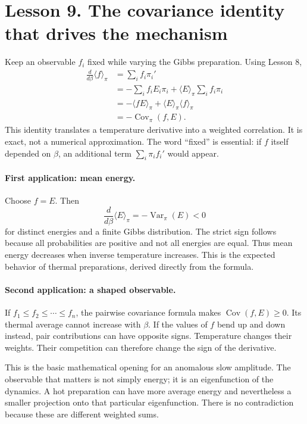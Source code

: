 \documentclass[11pt]{article}
\newcommand{\Cov}{\operatorname{Cov}}
\newcommand{\Var}{\operatorname{Var}}
\begin{document}
\clearpage
\section*{Lesson 9. The covariance identity that drives the mechanism}
Keep an observable $f_i$ fixed while varying the Gibbs preparation. Using
Lesson 8,
\begin{align*}
\frac{d}{d\beta}\langle f\rangle_\pi
&=\sum_i f_i\pi_i'\\
&=-\sum_i f_i E_i\pi_i+\langle E\rangle_\pi\sum_i f_i\pi_i\\
&=-\langle fE\rangle_\pi+\langle E\rangle_\pi\langle f\rangle_\pi\\
&=-\Cov_\pi(f,E).
\end{align*}
This identity translates a temperature derivative into a weighted correlation.
It is exact, not a numerical approximation. The word ``fixed'' is essential:
if $f$ itself depended on $\beta$, an additional term
$\sum_i\pi_i f_i'$ would appear.

\paragraph{First application: mean energy.}
Choose $f=E$. Then
\[
\frac{d}{d\beta}\langle E\rangle_\pi=-\Var_\pi(E)<0
\]
for distinct energies and a finite Gibbs distribution. The strict sign follows
because all probabilities are positive and not all energies are equal.
Thus mean energy decreases when inverse temperature increases. This is the
expected behavior of thermal preparations, derived directly from the formula.

\paragraph{Second application: a shaped observable.}
If $f_1\leq f_2\leq\cdots\leq f_n$, the pairwise covariance formula makes
$\Cov(f,E)\geq0$. Its thermal average cannot increase with $\beta$.
If the values of $f$ bend up and down instead, pair contributions can have
opposite signs. Temperature changes their weights. Their competition can
therefore change the sign of the derivative.

This is the basic mathematical opening for an anomalous slow amplitude. The
observable that matters is not simply energy; it is an eigenfunction of the
dynamics. A hot preparation can have more average energy and nevertheless a
smaller projection onto that particular eigenfunction. There is no
contradiction because these are different weighted sums.
\end{document}
